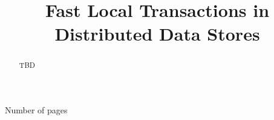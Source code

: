 \documentclass[preprint]{sigplanconf-eurosys}
\newcommand{\remove}[1]{}
\begin{document}
\setlength{\pdfpageheight}{\paperheight}
\setlength{\pdfpagewidth}{\paperwidth}




\title{Fast Local Transactions in Distributed Data Stores}

           {Number of pages}
           {}

\remove{

 Aran Bergman\\
 	\affaddr{Technion -- I.I.T}\\
	\email{aranb@technion.ac.il}
\and %
Edward Bortnikov\\
	\affaddr{Yahoo Research}\\
	\email{ebortnik@yahoo-inc.com}
\and %
	Yonatan Gottesman\\
	\affaddr{Yahoo Research}\\
	\email{yonatang@yahoo-inc.com}
\and %
Eshcar Hilel\\
	\affaddr{Yahoo Research}\\
	\email{eshcar@yahoo-inc.com}
\and %
Idit Keidar\\
	\affaddr{Technion -- I.I.T}\\
	\email{idish@ee.technion.ac.il}
\and %
Ohad Shacham\\
	\affaddr{Yahoo Research}\\
 	\email{ohads@yahoo-inc.com}
 
}


\maketitle

\sloppy


\begin{abstract}
TBD
\end{abstract}
\end{document}
